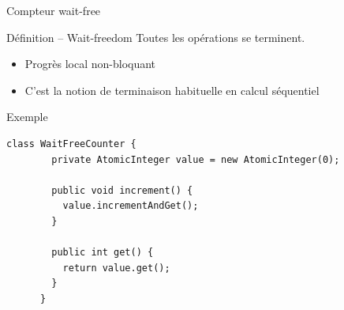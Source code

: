 
\begingroup

\begin{frame}[fragile]{Compteur wait-free}

  \begin{block}{Définition -- Wait-freedom}
    Toutes les opérations se terminent.
    \begin{itemize}
    \item Progrès local non-bloquant
    \item C'est la notion de terminaison habituelle en calcul séquentiel
    \end{itemize}
  \end{block}

  \begin{exampleblock}{Exemple}
    \begin{lstlisting}[gobble=6]
      class WaitFreeCounter {
        private AtomicInteger value = new AtomicInteger(0);
        
        public void increment() {
          value.incrementAndGet();
        }
        
        public int get() {
          return value.get();
        }
      }
    \end{lstlisting}
  \end{exampleblock}

\end{frame}

\endgroup
\endinput
